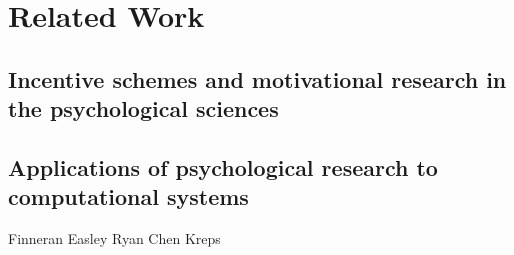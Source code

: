 \section{Related Work}

\subsection{Incentive schemes and motivational research in the psychological sciences}

\subsection{Applications of psychological research to computational systems}

 Finneran\cite{Finneran05}
 Easley\cite{Easley13} 
 Ryan\cite{Ryan00}
 Chen\cite{Chen10}
 Kreps\cite{Kreps97}